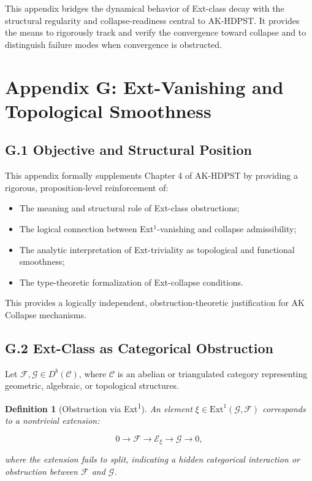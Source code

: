 \documentclass[11pt]{article}
\newtheorem{definition}[theorem]{Definition}
\begin{document}
This appendix bridges the dynamical behavior of Ext-class decay with the structural regularity and collapse-readiness central to AK-HDPST. It provides the means to rigorously track and verify the convergence toward collapse and to distinguish failure modes when convergence is obstructed.



\section*{Appendix G: Ext-Vanishing and Topological Smoothness}

\subsection*{G.1 Objective and Structural Position}

This appendix formally supplements Chapter 4 of AK-HDPST by providing a rigorous, proposition-level reinforcement of:

\begin{itemize}
    \item The meaning and structural role of Ext-class obstructions;
    \item The logical connection between Ext$^1$-vanishing and collapse admissibility;
    \item The analytic interpretation of Ext-triviality as topological and functional smoothness;
    \item The type-theoretic formalization of Ext-collapse conditions.
\end{itemize}

This provides a logically independent, obstruction-theoretic justification for AK Collapse mechanisms.

\subsection*{G.2 Ext-Class as Categorical Obstruction}

Let \( \mathcal{F}, \mathcal{G} \in D^b(\mathcal{C}) \), where \( \mathcal{C} \) is an abelian or triangulated category representing geometric, algebraic, or topological structures.

\begin{definition}[Obstruction via Ext\textsuperscript{1}]
An element \( \xi \in \mathrm{Ext}^1(\mathcal{G}, \mathcal{F}) \) corresponds to a nontrivial extension:

\[
0 \to \mathcal{F} \to \mathcal{E}_\xi \to \mathcal{G} \to 0,
\]

where the extension fails to split, indicating a hidden categorical interaction or obstruction between \( \mathcal{F} \) and \( \mathcal{G} \).
\end{definition}
\end{document}
